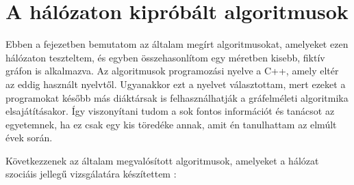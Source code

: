 \chapter{A hálózaton kipróbált algoritmusok}
Ebben a fejezetben bemutatom az általam megírt algoritmusokat, amelyeket ezen hálózaton teszteltem, és egyben összehasonlítom egy méretben kisebb, fiktív gráfon is alkalmazva. Az algoritmusok programozási nyelve a C++, amely eltér az eddig használt nyelvtől. Ugyanakkor ezt a nyelvet választottam, mert ezeket a programokat később más diáktársak is felhasználhatják a gráfelméleti algoritmika elsajátításakor. Így viszonyítani tudom a sok fontos információt és tanácsot az egyetemnek, ha ez csak egy kis töredéke annak, amit én tanulhattam az elmúlt évek során.

Következzenek az általam megvalósított algoritmusok, amelyeket  a hálózat szociáis jellegű vizsgálatára készítettem :
